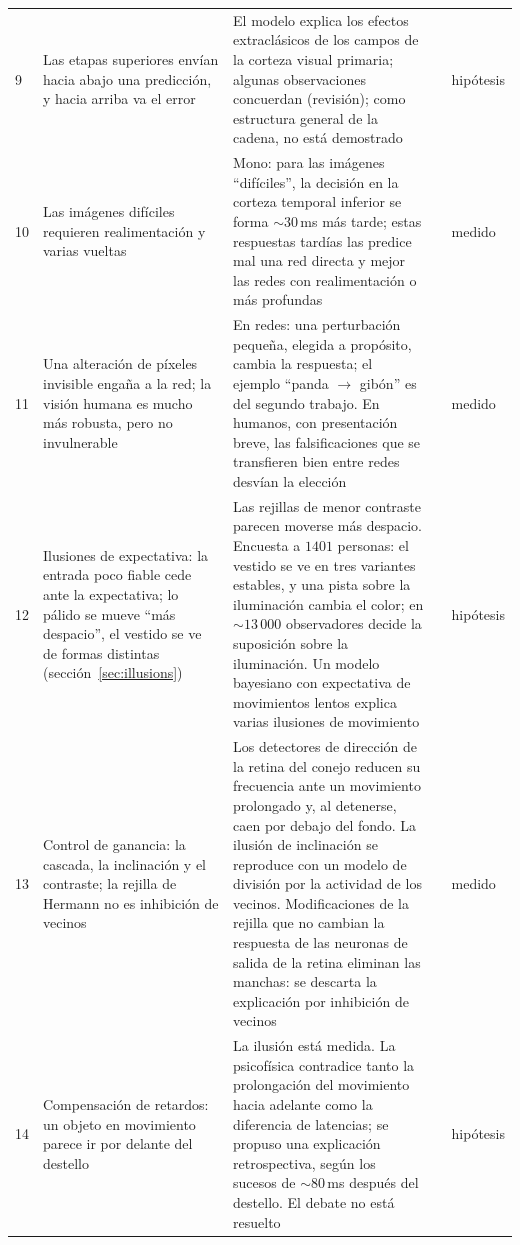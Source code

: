 {\begin{longtable}{>{\raggedright}p{0.5cm}>{\raggedright}p{4.0cm}>{\raggedright}p{5.6cm}>{\raggedright}p{2.3cm}>{\raggedright\arraybackslash}p{1.7cm}}
9 & Las etapas superiores envían hacia abajo una predicción, y hacia arriba va el error & El modelo explica los efectos extraclásicos de los campos de la corteza visual primaria; algunas observaciones concuerdan (revisión); como estructura general de la cadena, no está demostrado & \cite{RaoBallard1999,Keller2018} & hipótesis \\
10 & Las imágenes difíciles requieren realimentación y varias vueltas & Mono: para las imágenes “difíciles”, la decisión en la corteza temporal inferior se forma $\sim30$\,ms más tarde; estas respuestas tardías las predice mal una red directa y mejor las redes con realimentación o más profundas & \cite{Kar2019} & medido \\
11 & Una alteración de píxeles invisible engaña a la red; la visión humana es mucho más robusta, pero no invulnerable & En redes: una perturbación pequeña, elegida a propósito, cambia la respuesta; el ejemplo “panda $\to$ gibón” es del segundo trabajo. En humanos, con presentación breve, las falsificaciones que se transfieren bien entre redes desvían la elección & \cite{Szegedy2014,Goodfellow2015,Elsayed2018} & medido \\
12 & Ilusiones de expectativa: la entrada poco fiable cede ante la expectativa; lo pálido se mueve “más despacio”, el vestido se ve de formas distintas (sección~\ref{sec:illusions}) & Las rejillas de menor contraste parecen moverse más despacio. Encuesta a $1401$ personas: el vestido se ve en tres variantes estables, y una pista sobre la iluminación cambia el color; en $\sim13\,000$ observadores decide la suposición sobre la iluminación. Un modelo bayesiano con expectativa de movimientos lentos explica varias ilusiones de movimiento & \cite{Thompson1982,LaferSousa2015,Wallisch2017,Weiss2002,Purves2011} & hipótesis \\
13 & Control de ganancia: la cascada, la inclinación y el contraste; la rejilla de Hermann no es inhibición de vecinos & Los detectores de dirección de la retina del conejo reducen su frecuencia ante un movimiento prolongado y, al detenerse, caen por debajo del fondo. La ilusión de inclinación se reproduce con un modelo de división por la actividad de los vecinos. Modificaciones de la rejilla que no cambian la respuesta de las neuronas de salida de la retina eliminan las manchas: se descarta la explicación por inhibición de vecinos & \cite{BarlowHill1963,Schwartz2009,SchillerCarvey2005} & medido \\
14 & Compensación de retardos: un objeto en movimiento parece ir por delante del destello & La ilusión está medida. La psicofísica contradice tanto la prolongación del movimiento hacia adelante como la diferencia de latencias; se propuso una explicación retrospectiva, según los sucesos de $\sim80$\,ms después del destello. El debate no está resuelto & \cite{Nijhawan1994,EaglemanSejnowski2000} & hipótesis \\

\end{longtable}}
